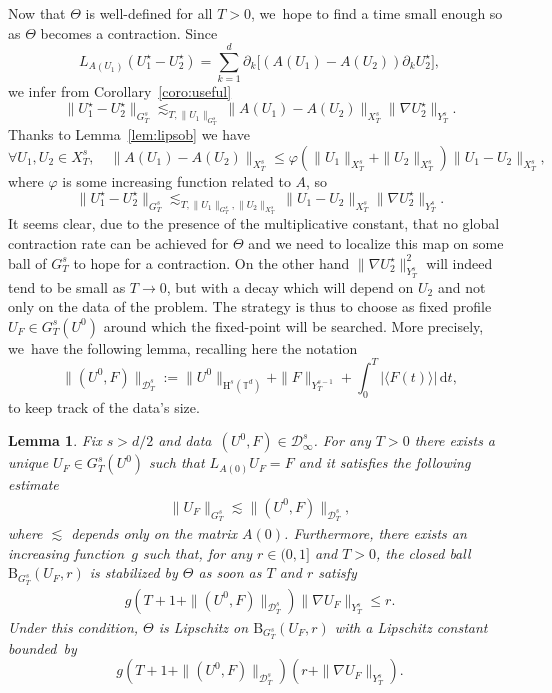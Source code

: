 \documentclass[10pt]{amsart}
\newtheorem{lem}[prop]{Lemma}
\theoremstyle{definition}
\newcommand\T{\mathbb{T}}
\newcommand\dd{\mathrm{d}}
\newcommand\B{\mathrm{B}}
\renewcommand\H{\mathrm{H}}
\let\ffi\varphi
\begin{document}
Now that $\Theta$ is well-defined for all $T>0$, we~hope to find a time small enough so as $\Theta$ becomes a contraction. Since\vspace*{-3pt}
\[
L_{A(U_1)}(U_1^\star - U_2^\star) = \sum_{k=1}^d \partial_k\bigl[(A(U_1)-A(U_2))\partial_k U_2^\star\bigr],
\]we infer from Corollary~\ref{coro:useful}\vspace*{-3pt}
\[
\|U_1^\star - U_2^\star\|_{G_T^s} \lesssim_{T,\|U_1\|_{G_T^s}} \|A(U_1)-A(U_2)\|_{X_T^s} \|\nabla U_2^\star\|_{Y_T^s}.
\]
Thanks to Lemma~\ref{lem:lipsob} we have
\begin{equation}\label{ineq:lipAvrai}
\forall U_1,U_2\in X_T^s,\quad \|A(U_1)-A(U_2)\|_{X_T^s} \leq \ffi(\|U_1\|_{X_T^s}+\|U_2\|_{X_T^s})\|U_1-U_2\|_{X_T^s},
\end{equation}
where $\ffi$ is some increasing function related to $A$, so
\begin{equation}\label{ineq:contrapa}
\|U_1^\star - U_2^\star\|_{G_T^s} \lesssim_{T,\|U_1\|_{G_T^s}, \|U_2\|_{X_T^s}} \|U_1-U_2\|_{X_T^s} \|\nabla U_2^\star\|_{Y_T^s}.
\end{equation}
It seems clear, due to the presence of the multiplicative constant, that no global contraction rate can be achieved for $\Theta$ and we need to localize this map on some ball of $G_T^s$ to hope for a contraction. On the other hand $\|\nabla U_2^\star \|_{Y_T^s}^2$ will indeed tend to be small as $T\to 0$, but with a decay which will depend on $U_2$ and not only on the data of the problem. The strategy is thus to choose as fixed profile $U_F\in G_{T}^s(U^0)$ around which the fixed-point will be searched. More precisely, we~have the following lemma, recalling here the notation\vspace*{-3pt}
\[
\| (U^0,F)\| _{\mathcal D_T^{s}}:=\|U^0\|_{\H^s(\T^d)}+\|F\|_{Y_T^{s-1}}+\int_0^T |\langle F(t)\rangle|\,\dd t,
\]
to keep track of the data's size.
\begin{lem}\label{lem:contraction}
Fix $s>d/2$ and data~$(U^0,F) \in \mathcal D_\infty^s$. For any $T>0$ there exists a unique $U_F\in G_T^s(U^0)$ such that $L_{A(0)} U_F = F$ and it satisfies the following estimate
\begin{align}\label{ineq:UF}
\|U_F\|_{G_T^s} \lesssim \| (U^0,F)\| _{\mathcal D_T^{s}},
\end{align}
where $\lesssim$ depends only on the matrix $A(0)$. Furthermore, there exists an increasing function~$g$ such that, for any $r\in(0,1]$ and $T>0$, the closed ball $\B_{G_T^s}(U_F,r)$ is stabilized by $\Theta$ as soon as $T$ and $r$ satisfy
\begin{align}\label{ineq:stabT}
g(T+1+ \| (U^0,F)\| _{\mathcal D_T^{s} })\|\nabla U_F\|_{Y_T^s} \leq r.
\end{align}
Under this condition, $\Theta$ is Lipschitz on $\B_{G_T^s}(U_F,r)$ with a Lipschitz constant bound\-ed~by
\[
g(T+1+ \| (U^0,F)\| _{\mathcal D_T^{s}})(r+\|\nabla U_F\|_{Y_T^s}).
\]
\end{lem}
\end{document}
